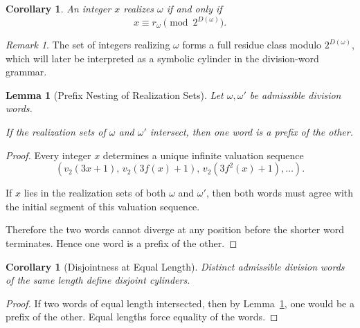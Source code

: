 \documentclass[12pt, oneside]{article}
\numberwithin{equation}{section}
\theoremstyle{definition}
\theoremstyle{plain}
\newtheorem{lemma}[theorem]{Lemma}
\newtheorem{corollary}[theorem]{Corollary}
\theoremstyle{remark}
\newtheorem*{remark}{Remark}
\begin{document}
\begin{corollary}
An integer $x$ realizes $\omega$ if and only if
\[
x \equiv r_\omega \pmod{2^{D(\omega)}}.
\]
\end{corollary}

\begin{remark}
The set of integers realizing $\omega$ forms a full residue class modulo
$2^{D(\omega)}$, which will later be interpreted as a symbolic cylinder
in the division-word grammar.
\end{remark}


\begin{lemma}[Prefix Nesting of Realization Sets]
\label{lem:prefix-uniqueness}
Let $\omega,\omega'$ be admissible division words.

If the realization sets of $\omega$ and $\omega'$ intersect, then one word
is a prefix of the other.
\end{lemma}

\begin{proof}
Every integer \(x\) determines a unique infinite valuation sequence
\[
(v_2(3x+1),\, v_2(3f(x)+1),\, v_2(3f^2(x)+1),\dots).
\]

If \(x\) lies in the realization sets of both \(\omega\) and \(\omega'\),
then both words must agree with the initial segment of this valuation sequence.

Therefore the two words cannot diverge at any position before the shorter
word terminates. Hence one word is a prefix of the other.
\end{proof}

\begin{corollary}[Disjointness at Equal Length]
Distinct admissible division words of the same length define disjoint cylinders.
\end{corollary}

\begin{proof}
If two words of equal length intersected, then by
Lemma~\ref{lem:prefix-uniqueness},
one would be a prefix of the other.
Equal lengths force equality of the words.
\end{proof}

\end{document}
